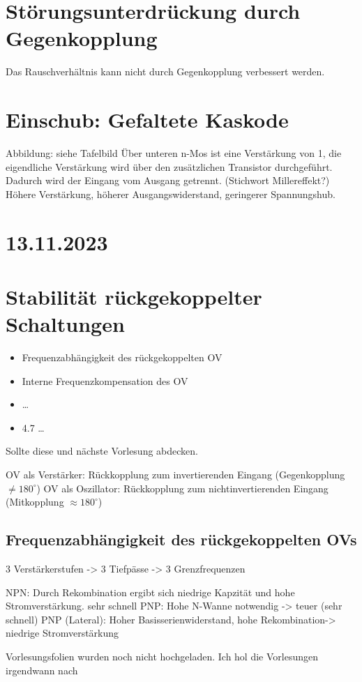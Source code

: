 \documentclass[a5paper]{article}
\begin{document}
\section*{Störungsunterdrückung durch Gegenkopplung}
Das Rauschverhältnis kann nicht durch Gegenkopplung verbessert werden.

\section*{Einschub: Gefaltete Kaskode}
Abbildung: siehe Tafelbild
Über unteren n-Mos ist eine Verstärkung von 1, die eigendliche Verstärkung wird
über den zusätzlichen Transistor durchgeführt. Dadurch wird der Eingang vom Ausgang getrennt. (Stichwort Millereffekt?)
Höhere Verstärkung, höherer Ausgangswiderstand, geringerer Spannungshub.

\section*{13.11.2023}
\section*{Stabilität rückgekoppelter Schaltungen}
\begin{itemize}
    \item Frequenzabhängigkeit des rückgekoppelten OV
    \item Interne Frequenzkompensation des OV
    \item \ldots
    \item 4.7 \ldots
\end{itemize}
Sollte diese und nächste Vorlesung abdecken.

OV als Verstärker: Rückkopplung zum invertierenden Eingang (Gegenkopplung $\neq 180^{\circ}$)
OV als Oszillator: Rückkopplung zum nichtinvertierenden Eingang (Mitkopplung $\approx 180^{\circ}$)

\subsection*{Frequenzabhängigkeit des rückgekoppelten OVs}
3 Verstärkerstufen -> 3 Tiefpässe -> 3 Grenzfrequenzen

NPN: Durch Rekombination ergibt sich niedrige Kapzität und hohe Stromverstärkung. sehr schnell
PNP: Hohe N-Wanne notwendig -> teuer (sehr schnell)
PNP (Lateral): Hoher Basisserienwiderstand, hohe Rekombination-> niedrige Stromverstärkung

Vorlesungsfolien wurden noch nicht hochgeladen. Ich hol die Vorlesungen irgendwann nach 
\end{document}

